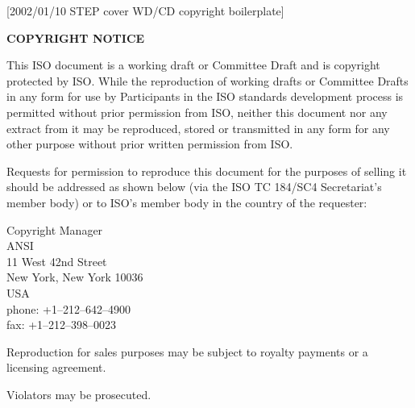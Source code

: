 [2002/01/10 STEP cover WD/CD copyright boilerplate]

\vspace*{\baselineskip}
\textbf{\large COPYRIGHT NOTICE}

\begin{small}
This ISO document is a working draft or Committee Draft
and is copyright protected by ISO.
While the reproduction of working drafts or Committee Drafts
in any form for use by Participants in the ISO standards
development process is permitted without prior permission
from ISO, neither this document nor any extract from
it may be reproduced, stored or
transmitted in any form for any other purpose without prior
written permission from ISO.

Requests for permission to reproduce this document for the
purposes of selling it should be addressed as shown below
(via the ISO TC 184/SC4 Secretariat's member body)
or to ISO's member body in the
country of the requester:
\begin{center}
Copyright Manager \\
ANSI \\
11 West 42nd Street \\
New York, New York 10036 \\
USA \\
phone: +1--212--642--4900 \\
fax:   +1--212--398--0023
\end{center}
Reproduction for sales purposes may be subject to royalty payments
or a licensing agreement.

Violators may be prosecuted.

\end{small}

\endinput
